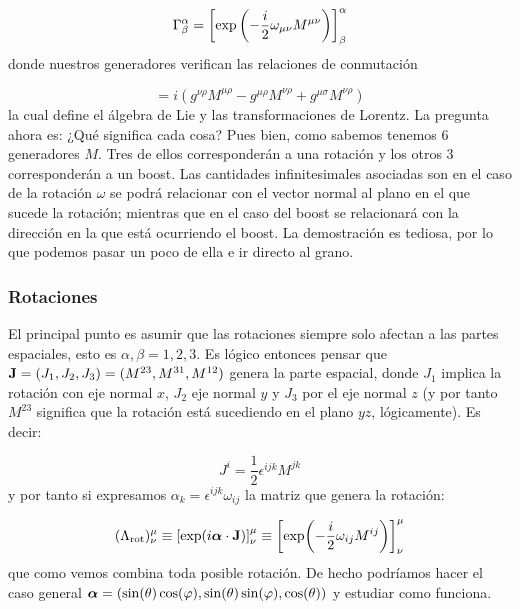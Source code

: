 \begin{equation}
	\Gamma^\alpha_\beta = \left[ \exp\left( -\frac{i}{2} \omega_{\mu \nu} M^{\mu \nu}  \right) \right]^{\alpha}_\beta
\end{equation}
donde nuestros generadores verifican las relaciones de conmutación

\begin{equation}
	[M^{\mu \nu},M^{\rho \sigma} ] =i (g^{\nu \rho} M^{\mu \rho} - g^{\mu \rho} M^{\nu  \rho} + g^{\mu \sigma} M^{\nu \rho})
\end{equation}
la cual define el álgebra de Lie y las transformaciones de Lorentz. La pregunta ahora es: ¿Qué significa cada cosa? Pues bien, como sabemos tenemos 6 generadores $M$. Tres de ellos corresponderán a una rotación y los otros 3 corresponderán a un boost. Las cantidades infinitesimales asociadas son en el caso de la rotación $\omega$ se podrá relacionar con el vector normal al plano en el que sucede la rotación; mientras que en el caso del boost se relacionará con la dirección en la que está ocurriendo el boost. La demostración es tediosa, por lo que podemos pasar un poco de ella e ir directo al grano. 

\subsubsection{Rotaciones}

El principal punto es asumir que las rotaciones siempre solo afectan a las partes espaciales, esto es $\alpha,\beta=1,2,3$. Es lógico entonces pensar que $\mathbf{J}=(J_1,J_2,J_3)=(M^{23},M^{31},M^{12})$ genera la parte espacial, donde $J_1$ implica la rotación con eje normal $x$, $J_2$ eje normal $y$ y $J_3$ por el eje normal $z$ (y por tanto $M^{23}$ significa que la rotación está sucediendo en el plano $yz$, lógicamente). Es decir:

\begin{equation}
	J^i = \frac{1}{2} \epsilon^{ijk} M^{jk}
\end{equation}
y por tanto si expresamos $\alpha_k = \epsilon^{ijk} \omega_{ij}$ la matriz que genera la rotación:

\begin{equation}
	(\Lambda_{\text{rot}})^\mu_\nu \equiv \left[ \exp(i\boldsymbol{\alpha}\cdot \mathbf{J}) \right]^\mu_\nu\equiv \left[  \exp(-\frac{i}{2}\omega_{ij}M^{ij}) \right]^\mu_\nu
\end{equation} 
que como vemos combina toda posible rotación. De hecho podríamos hacer el caso general $\boldsymbol{\alpha} = (\sin(\theta)\cos(\varphi),\sin(\theta)\sin(\varphi),\cos(\theta))$ y estudiar como funciona.

